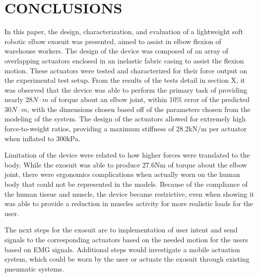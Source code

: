 \documentclass[letterpaper, 10 pt, conference]{ieeeconf}  %
\begin{document}
\section{CONCLUSIONS}

In this paper, the design, characterization, and evaluation of a lightweight soft robotic elbow exosuit was presented, aimed to assist in elbow flexion of warehouse workers. The design of the device was composed of an array of overlapping actuators enclosed in an inelastic fabric casing to assist the flexion motion. These actuators were tested and characterized for their force output on the experimental test setup.  From the results of the tests detail in section X, it was observed that the device was able to perform the primary task of providing nearly 28$N \cdot m$ of torque about an elbow joint, within 10\% error of the predicted 30$N \cdot m$, with the dimensions chosen based off of the parameters chosen from the modeling of the system.  The design of the actuators allowed for extremely high force-to-weight ratios, providing a maximum stiffness of 28.2kN/m per actuator when inflated to 300kPa.  

	Limitation of the device were related to how higher forces were translated to the body.  While the exosuit was able to produce 27.6Nm of torque about the elbow joint, there were ergonomics complications when actually worn on the human body that could not be represented in the models.  Because of the compliance of the human tissue and muscle, the device became restrictive, even when showing it was able to provide a reduction in muscles activity for more realistic loads for the user.  

The next steps for the exosuit are to implementation of user intent and send signals to the corresponding actuators based on the needed motion for the users based on EMG signals.  Additional steps would investigate a mobile actuation system, which could be worn by the user or actuate the exosuit through existing pneumatic systems.  

\addtolength{\textheight}{-12cm}   %
\end{document}
